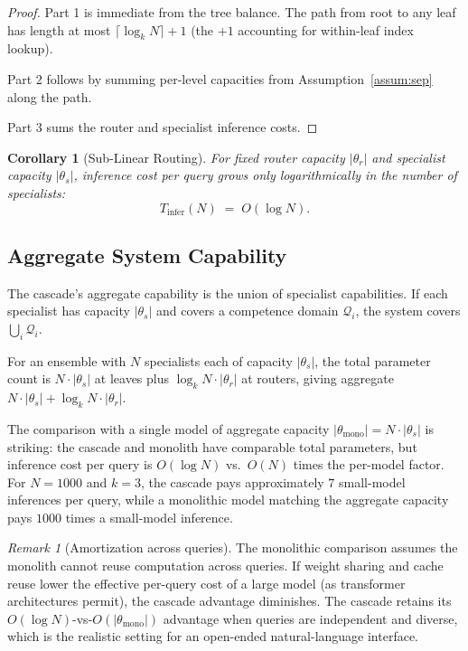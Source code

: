 \documentclass[11pt,twocolumn,a4paper]{article}
\newtheorem{corollary}[theorem]{Corollary}
\theoremstyle{definition}
\theoremstyle{remark}
\newtheorem{remark}[theorem]{Remark}
\begin{document}
\begin{proof}
Part 1 is immediate from the tree balance. The path from root to any leaf has length at most $\lceil \log_k N \rceil + 1$ (the $+1$ accounting for within-leaf index lookup).

Part 2 follows by summing per-level capacities from Assumption~\ref{assum:sep} along the path.

Part 3 sums the router and specialist inference costs.
\end{proof}

\begin{corollary}[Sub-Linear Routing]
\label{cor:sublinear}
For fixed router capacity $|\theta_r|$ and specialist capacity $|\theta_s|$, inference cost per query grows only logarithmically in the number of specialists:
\[
T_{\text{infer}}(N) \;=\; O(\log N).
\]
\end{corollary}

\subsection{Aggregate System Capability}

The cascade's aggregate capability is the union of specialist capabilities. If each specialist has capacity $|\theta_s|$ and covers a competence domain $\mathcal{Q}_i$, the system covers $\bigcup_i \mathcal{Q}_i$.

For an ensemble with $N$ specialists each of capacity $|\theta_s|$, the total parameter count is $N \cdot |\theta_s|$ at leaves plus $\log_k N \cdot |\theta_r|$ at routers, giving aggregate $N \cdot |\theta_s| + \log_k N \cdot |\theta_r|$.

The comparison with a single model of aggregate capacity $|\theta_{\text{mono}}| = N \cdot |\theta_s|$ is striking: the cascade and monolith have comparable total parameters, but inference cost per query is $O(\log N)$ vs.\ $O(N)$ times the per-model factor. For $N = 1000$ and $k = 3$, the cascade pays approximately $7$ small-model inferences per query, while a monolithic model matching the aggregate capacity pays $1000$ times a small-model inference.

\begin{remark}[Amortization across queries]
The monolithic comparison assumes the monolith cannot reuse computation across queries. If weight sharing and cache reuse lower the effective per-query cost of a large model (as transformer architectures permit), the cascade advantage diminishes. The cascade retains its $O(\log N)$-vs-$O(|\theta_{\text{mono}}|)$ advantage when queries are independent and diverse, which is the realistic setting for an open-ended natural-language interface.
\end{remark}
\end{document}
